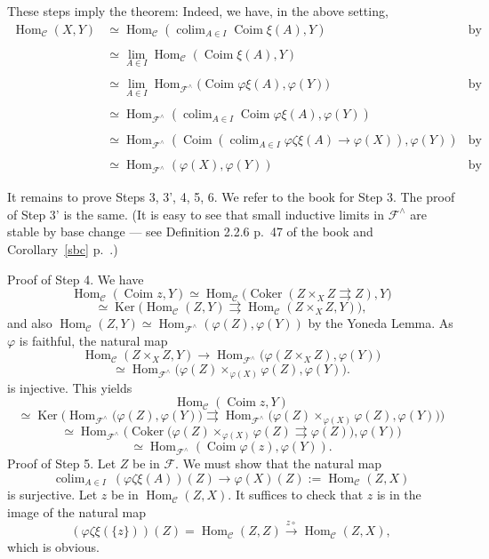 \documentclass[12pt]{article}%
\theoremstyle{remark}
\theoremstyle{definition}
\newcommand{\C}{\mathcal C}
\newcommand{\F}{\mathcal F}
\DeclareMathOperator*{\colim}{colim}
\DeclareMathOperator{\Coim}{Coim}
\DeclareMathOperator{\Coker}{Coker}
\DeclareMathOperator{\Hom}{Hom}%
\DeclareMathOperator{\Ker}{Ker}
\begin{document}
These steps imply the theorem: Indeed, we have, in the above setting, 
%
\begin{align*} 
%
\Hom_\C(X,Y)&\simeq\Hom_\C\left(\colim_{A\in I}\Coim\xi(A),Y\right)&\text{by Step 6}\\ \\ 
%
&\simeq\lim_{A\in I}\Hom_\C(\Coim\xi(A),Y)\\ \\ 
%
&\simeq\lim_{A\in I}\Hom_{\F^\wedge}\Big(\Coim\varphi\xi(A),\varphi(Y)\Big)&\text{by Step 4}\\ \\ 
%
&\simeq\Hom_{\F^\wedge}\left(\colim_{A\in I}\Coim\varphi\xi(A),\varphi(Y)\right)\\ \\ 
%
&\simeq\Hom_{\F^\wedge}\left(\Coim\left(\colim_{A\in I}\varphi\zeta\xi(A)\to\varphi(X)\right),\varphi(Y)\right)&\text{by Step 3'}\\ \\ 
%
&\simeq\Hom_{\F^\wedge}(\varphi(X),\varphi(Y))&\text{by Step 5.}
%
\end{align*} 
%

It remains to prove Steps 3, 3', 4, 5, 6. We refer to the book for Step 3. The proof of Step 3' is the same. (It is easy to see that small inductive limits in $\F^\wedge$ are stable by base change --- see Definition 2.2.6 p.~47 of the book and Corollary~\ref{sbc} p.~\pageref{sbc}.) 

\noindent Proof of Step 4. We have 
$$
\Hom_\C(\Coim z,Y)\simeq\Hom_\C\big(\Coker(Z\times_XZ\rightrightarrows Z),Y\big)
$$
$$
\simeq\Ker\big(\Hom_\C(Z,Y)\rightrightarrows\Hom_\C(Z\times_XZ,Y)\big),
$$ 
and also $\Hom_\C(Z,Y)\simeq\Hom_{\F^\wedge}(\varphi(Z),\varphi(Y))$ by the Yoneda Lemma. As $\varphi$ is faithful, the natural map 
$$
\Hom_\C(Z\times_XZ,Y)\to\Hom_{\F^\wedge}\big(\varphi(Z\times_XZ),\varphi(Y)\big)
$$
$$
\simeq\Hom_{\F^\wedge}\big(\varphi(Z)\times_{\varphi(X)}\varphi(Z),\varphi(Y)\big).
$$ 
is injective. This yields 
$$
\Hom_\C(\Coim z,Y)
$$
$$
\simeq\Ker\Big(\Hom_{\F^\wedge}\big(\varphi(Z),\varphi(Y)\big)\rightrightarrows\Hom_{\F^\wedge}\big(\varphi(Z)\times_{\varphi(X)}\varphi(Z),\varphi(Y)\big)\Big)
$$
$$
\simeq\Hom_{\F^\wedge}\Big(\Coker\big(\varphi(Z)\times_{\varphi(X)}\varphi(Z)\rightrightarrows\varphi(Z)\big),\varphi(Y)\Big)
$$
$$
\simeq\Hom_{\F^\wedge}(\Coim\varphi(z),\varphi(Y)).
$$
Proof of Step 5. Let $Z$ be in $\F$. We must show that the natural map 
$$
\colim_{A\in I}\ (\varphi\zeta\xi(A))(Z)\to\varphi(X)(Z):=\Hom_\C(Z,X) 
$$
is surjective. Let $z$ be in $\Hom_\C(Z,X)$. It suffices to check that $z$ is in the image of the natural map 
$$
(\varphi\zeta\xi(\{z\}))(Z)=\Hom_\C(Z,Z)\xrightarrow{z\circ}\Hom_\C(Z,X),
$$
which is obvious. 
\end{document}
